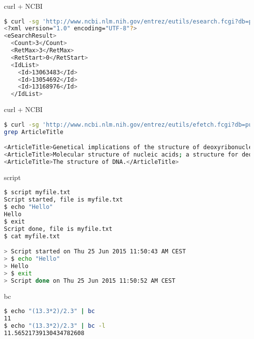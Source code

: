 \documentclass{beamer}
\begin{document}
\begin{frame}[fragile]
 \begin{center}
    \huge{curl + NCBI}\\
    \end{center}
\begin{lstlisting}[language=bash]
$ curl -sg 'http://www.ncbi.nlm.nih.gov/entrez/eutils/esearch.fcgi?db=pubmed&term=watson[AU]+crick[AU]+1953[Date+-+Publication]'  
<?xml version="1.0" encoding="UTF-8"?>
<eSearchResult>
  <Count>3</Count>
  <RetMax>3</RetMax>
  <RetStart>0</RetStart>
  <IdList>
    <Id>13063483</Id>
    <Id>13054692</Id>
    <Id>13168976</Id>
  </IdList>
 \end{lstlisting}
\end{frame} 


\begin{frame}[fragile]
 \begin{center}
    \huge{curl + NCBI}\\
    \end{center}
\begin{lstlisting}[language=bash,breaklines=true]
$ curl -sg 'http://www.ncbi.nlm.nih.gov/entrez/eutils/efetch.fcgi?db=pubmed&id=13063483,13054692,13168976&retmode=xml' |\
grep ArticleTitle

<ArticleTitle>Genetical implications of the structure of deoxyribonucleic acid.</ArticleTitle>
<ArticleTitle>Molecular structure of nucleic acids; a structure for deoxyribose nucleic acid.</ArticleTitle>
<ArticleTitle>The structure of DNA.</ArticleTitle>
 \end{lstlisting}
\end{frame} 

\begin{frame}[fragile]
 \begin{center}
    \huge{script}\\
    \end{center}
\begin{lstlisting}[language=bash,breaklines=true]
$ script myfile.txt
Script started, file is myfile.txt
$ echo "Hello"
Hello
$ exit
Script done, file is myfile.txt
$ cat myfile.txt 

> Script started on Thu 25 Jun 2015 11:50:43 AM CEST
> $ echo "Hello"
> Hello
> $ exit
> Script done on Thu 25 Jun 2015 11:50:52 AM CEST

 \end{lstlisting}
\end{frame} 


\begin{frame}[fragile]
 \begin{center}
    \huge{bc}\\
  \end{center}
\begin{lstlisting}[language=bash]
$ echo "(13.3*2)/2.3" | bc
11
$ echo "(13.3*2)/2.3" | bc -l
11.56521739130434782608
\end{lstlisting}
\end{frame}
\end{document}
